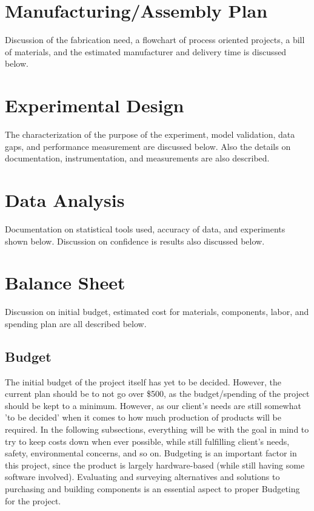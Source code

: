 \documentclass[12pt]{article}
\begin{document}
{{{	\newpage

\section{Manufacturing/Assembly Plan}
	Discussion of the fabrication need, a flowchart of process oriented projects, a bill of materials, and the estimated manufacturer and delivery time is discussed below.

	\newpage

\section{Experimental Design}
	The characterization of the purpose of the experiment, model validation, data gaps, and performance measurement are discussed below. Also the details on documentation, instrumentation, and measurements are also described.
  	
	\newpage	
  	
\section{Data Analysis}
	Documentation on statistical tools used, accuracy of data, and experiments shown below. Discussion on confidence is results also discussed below.

	\newpage

\section{Balance Sheet}
Discussion on initial budget, estimated cost for materials, components, labor, and spending plan are all described below.

		\subsection{Budget}
		The initial budget of the project itself has yet to be decided. However, the current plan should be to not go over \$500, as the budget/spending of the project should be kept to a minimum. However, as our client's needs are still somewhat 'to be decided' when it comes to how much production of products will be required. In the following subsections, everything will be with the goal in mind to try to keep costs down when ever possible, while still fulfilling client's needs, safety, environmental concerns, and so on. Budgeting is an important factor in this project, since the product is largely hardware-based (while still having some software involved). Evaluating and surveying alternatives and solutions to purchasing and building components is an essential aspect to proper Budgeting for the project.
		
}}}
\end{document}
